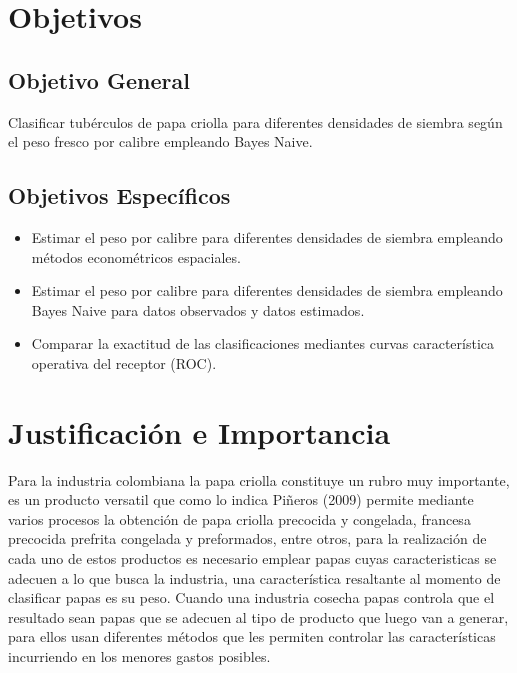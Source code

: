 \section{Objetivos}

\subsection{Objetivo General}

Clasificar tubérculos de papa criolla para diferentes densidades de siembra según el peso fresco por calibre empleando Bayes Naive.

\subsection{Objetivos Espec\'ificos}
 
\begin{itemize}
\item  Estimar el peso por calibre para diferentes densidades de siembra empleando métodos econométricos espaciales.
\item	 Estimar el peso por calibre para diferentes densidades de siembra empleando Bayes Naive para datos observados y datos estimados.
\item  Comparar la exactitud de las clasificaciones mediantes curvas característica operativa del receptor (ROC).
\end{itemize}

\section{Justificaci\'on e Importancia}

Para la industria colombiana la papa criolla constituye un rubro muy importante, es un producto versatil que como lo indica Piñeros (2009) permite mediante varios procesos la obtención de papa criolla precocida y congelada, francesa precocida prefrita congelada y preformados, entre otros, para la realización de cada uno de estos productos es necesario emplear papas cuyas caracteristicas se adecuen a lo que busca la industria, una característica resaltante al momento de clasificar papas es su peso. Cuando una industria cosecha papas controla que el resultado sean papas que se adecuen al tipo de producto que luego van a generar, para ellos usan diferentes métodos que les permiten controlar las características incurriendo en los menores gastos posibles.\\

